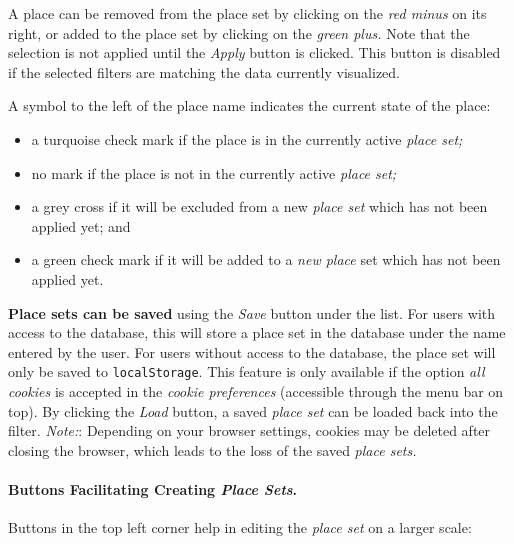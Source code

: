 A place can be removed from the place set by clicking on the \emph{red minus} on its right, or added to the place set by clicking on the \emph{green plus.}
Note that the selection is not applied until the \emph{Apply} button is clicked.
This button is disabled if the selected filters are matching the data currently visualized.

A symbol to the left of the place name indicates the current state of the place:

\begin{itemize}
  \item a turquoise check mark if the place is in the currently active \emph{place set;}
  \item no mark if the place is not in the currently active \emph{place set;}
  \item a grey cross if it will be excluded from a new \emph{place set} which has not been applied yet; and
  \item a green check mark if it will be added to a \emph{new place} set which has not been applied yet.
\end{itemize}

\textbf{Place sets can be saved} using the \emph{Save} button under the list.
For users with access to the database, this will store a place set in the database under the name entered by the user.
For users without access to the database, the place set will only be saved to \verb!localStorage!.
This feature is only available if the option \emph{all cookies} is accepted in the \emph{cookie preferences} (accessible through the menu bar on top).
By clicking the \emph{Load} button, a saved \emph{place set} can be loaded back into the filter.
\emph{Note:}: Depending on your browser settings, cookies may be deleted after closing the browser, which leads to the loss of the saved \emph{place sets.}

\paragraph{Buttons Facilitating Creating \emph{Place Sets}.}
Buttons in the top left corner help in editing the \emph{place set} on a larger scale:

